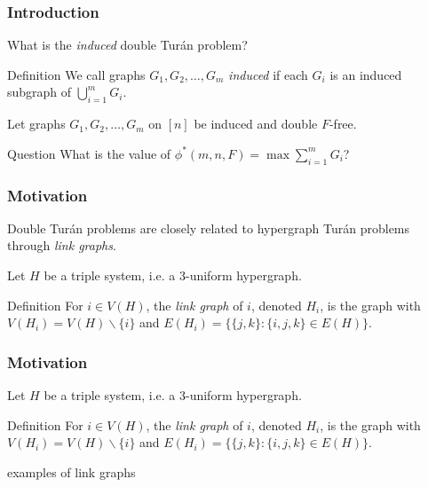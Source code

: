 \documentclass{beamer}
\begin{document}
\begin{frame}
  \frametitle{Introduction}

  What is the \textit{induced} double Turán problem? \pause

  \begin{block}{Definition}
    We call graphs $G_1, G_2, \ldots, G_m$ \textit{induced} if each $G_i$ is an induced subgraph of $\bigcup_{i = 1}^m G_i$.
  \end{block}

  \pause

  \vspace{0.5cm}

  Let graphs $G_1, G_2, \ldots, G_m$ on $[n]$ be induced and double $F$-free.

  \begin{block}{Question}
    What is the value of $\phi^*(m, n, F) = \max \sum_{i = 1}^m G_i$?
  \end{block}
\end{frame}

\begin{frame}
  \frametitle{Motivation}

  Double Turán problems are closely related to hypergraph Turán problems through \textit{link graphs}.

  \pause

  \vspace{0.5cm}

  Let $H$ be a triple system, i.e. a 3-uniform hypergraph. 
  
  \begin{block}{Definition}
    For $i \in V(H)$, the \textit{link graph} of $i$, denoted $H_i$, is the graph with $V(H_i) = V(H) \backslash \{i\}$ and $E(H_i) = \{\{j, k\} : \{i, j, k\} \in E(H)\}$. 
  \end{block}
\end{frame}

\begin{frame}

  \frametitle{Motivation}

  Let $H$ be a triple system, i.e. a 3-uniform hypergraph. 
  
  \begin{block}{Definition}
    For $i \in V(H)$, the \textit{link graph} of $i$, denoted $H_i$, is the graph with $V(H_i) = V(H) \backslash \{i\}$ and $E(H_i) = \{\{j, k\} : \{i, j, k\} \in E(H)\}$. 
  \end{block}

  \vspace{0.5cm}

  examples of link graphs
\end{frame}
\end{document}
